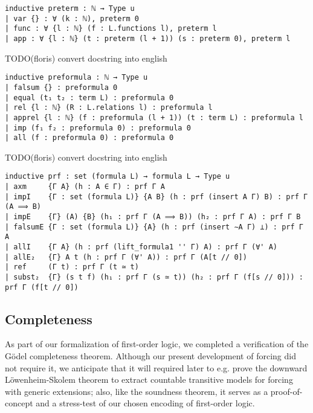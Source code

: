 \documentclass[a4paper,USenglish,cleveref, autoref]{lipics-v2019}
\begin{document}
\begin{lstlisting}
inductive preterm : ℕ → Type u
| var {} : ∀ (k : ℕ), preterm 0
| func : ∀ {l : ℕ} (f : L.functions l), preterm l
| app : ∀ {l : ℕ} (t : preterm (l + 1)) (s : preterm 0), preterm l
\end{lstlisting}

TODO(floris) convert docstring into english

\begin{lstlisting}
inductive preformula : ℕ → Type u
| falsum {} : preformula 0
| equal (t₁ t₂ : term L) : preformula 0
| rel {l : ℕ} (R : L.relations l) : preformula l
| apprel {l : ℕ} (f : preformula (l + 1)) (t : term L) : preformula l
| imp (f₁ f₂ : preformula 0) : preformula 0
| all (f : preformula 0) : preformula 0
\end{lstlisting}

TODO(floris) convert docstring into english


\begin{lstlisting}
inductive prf : set (formula L) → formula L → Type u
| axm     {Γ A} (h : A ∈ Γ) : prf Γ A
| impI    {Γ : set (formula L)} {A B} (h : prf (insert A Γ) B) : prf Γ (A ⟹ B)
| impE    {Γ} (A) {B} (h₁ : prf Γ (A ⟹ B)) (h₂ : prf Γ A) : prf Γ B
| falsumE {Γ : set (formula L)} {A} (h : prf (insert ∼A Γ) ⊥) : prf Γ A
| allI    {Γ A} (h : prf (lift_formula1 '' Γ) A) : prf Γ (∀' A)
| allE₂   {Γ} A t (h : prf Γ (∀' A)) : prf Γ (A[t // 0])
| ref     (Γ t) : prf Γ (t ≃ t)
| subst₂  {Γ} (s t f) (h₁ : prf Γ (s ≃ t)) (h₂ : prf Γ (f[s // 0])) : prf Γ (f[t // 0])
\end{lstlisting}

\subsection{Completeness}
As part of our formalization of first-order logic, we completed a verification of the G\"odel completeness theorem. Although our present development of forcing did not require it, we anticipate that it will required later to e.g. prove the downward L\"owenheim-Skolem theorem to extract countable transitive models for forcing with generic extensions; also, like the soundness theorem, it serves as a proof-of-concept and a stress-test of our chosen encoding of first-order logic.
\end{document}
